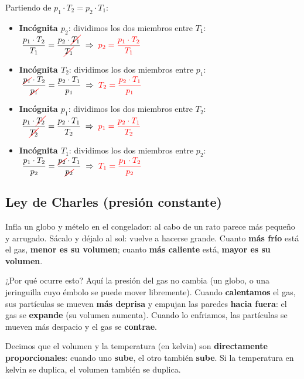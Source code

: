 Partiendo de \(p_1 \cdot T_2 = p_2 \cdot T_1\):
\begin{itemize}
    \item \textbf{Incógnita \(p_2\)}: dividimos los dos miembros entre \(T_1\):
    \(\;\dfrac{p_1 \cdot T_2}{T_1} = \dfrac{p_2 \cdot \cancelred{T_1}}{\cancelred{T_1}} \;\Rightarrow\; \textcolor{red}{p_2 = \dfrac{p_1 \cdot T_2}{T_1}}\)
    \item \textbf{Incógnita \(T_2\)}: dividimos los dos miembros entre \(p_1\):
    \(\;\dfrac{\cancelred{p_1} \cdot T_2}{\cancelred{p_1}} = \dfrac{p_2 \cdot T_1}{p_1} \;\Rightarrow\; \textcolor{red}{T_2 = \dfrac{p_2 \cdot T_1}{p_1}}\)
    \item \textbf{Incógnita \(p_1\)}: dividimos los dos miembros entre \(T_2\):
    \(\;\dfrac{p_1 \cdot \cancelred{T_2}}{\cancelred{T_2}} = \dfrac{p_2 \cdot T_1}{T_2} \;\Rightarrow\; \textcolor{red}{p_1 = \dfrac{p_2 \cdot T_1}{T_2}}\)
    \item \textbf{Incógnita \(T_1\)}: dividimos los dos miembros entre \(p_2\):
    \(\;\dfrac{p_1 \cdot T_2}{p_2} = \dfrac{\cancelred{p_2} \cdot T_1}{\cancelred{p_2}} \;\Rightarrow\; \textcolor{red}{T_1 = \dfrac{p_1 \cdot T_2}{p_2}}\)
\end{itemize}


\subsection{Ley de Charles (presión constante)}

 Infla un globo y mételo en el congelador: al cabo de un rato parece más pequeño y arrugado. Sácalo y déjalo al sol: vuelve a hacerse grande. Cuanto \textbf{más frío} está el gas, \textbf{menor es su volumen}; cuanto \textbf{más caliente} está, \textbf{mayor es su volumen}.

¿Por qué ocurre esto? Aquí la presión del gas no cambia (un globo, o una jeringuilla cuyo émbolo se puede mover libremente). Cuando \textbf{calentamos} el gas, sus partículas se mueven \textbf{más deprisa} y empujan las paredes \textbf{hacia fuera}: el gas se \textbf{expande} (su volumen aumenta). Cuando lo enfriamos, las partículas se mueven más despacio y el gas se \textbf{contrae}.

Decimos que el volumen y la temperatura (en kelvin) son \textbf{directamente proporcionales}: cuando uno \textbf{sube}, el otro también \textbf{sube}. Si la temperatura en kelvin se duplica, el volumen también se duplica.

